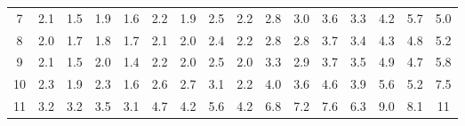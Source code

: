 \begin{table}[!htbp]
{\begin{tabular}{c|ccccccccccccccc}
        \rowcolor[HTML]{FFFFFF} 
        7                          & \multicolumn{1}{l|}{\cellcolor[HTML]{FFFFFF}2.1} & \cellcolor[HTML]{CCC0DA}1.5 & \cellcolor[HTML]{CCC0DA}1.9 & \cellcolor[HTML]{CCC0DA}1.6 & 2.2                         & \multicolumn{1}{l|}{\cellcolor[HTML]{CCC0DA}1.9} & 2.5                        & 2.2                         & 2.8                         & 3.0                         & 3.6                         & 3.3                       & 4.2                         & 5.7                         & 5.0                         \\
        \rowcolor[HTML]{FFFFFF} 
        8                          & \multicolumn{1}{l|}{\cellcolor[HTML]{CCC0DA}2.0} & \cellcolor[HTML]{CCC0DA}1.7 & \cellcolor[HTML]{CCC0DA}1.8 & \cellcolor[HTML]{CCC0DA}1.7 & 2.1                         & \multicolumn{1}{l|}{\cellcolor[HTML]{CCC0DA}2.0} & 2.4                        & 2.2                         & 2.8                         & 2.8                         & 3.7                         & 3.4                         & 4.3                         & 4.8                         & 5.2                         \\
        \rowcolor[HTML]{FFFFFF} 
        9                          & \multicolumn{1}{l|}{\cellcolor[HTML]{FFFFFF}2.1} & \cellcolor[HTML]{B1A0C7}1.5 & \cellcolor[HTML]{CCC0DA}2.0 & \cellcolor[HTML]{B1A0C7}1.4 & 2.2                         & \multicolumn{1}{l|}{\cellcolor[HTML]{CCC0DA}2.0} & 2.5                        & \cellcolor[HTML]{CCC0DA}2.0 & 3.3                         & 2.9                         & 3.7                         & 3.5                         & 4.9                         & 4.7                         & 5.8                         \\ \cline{3-7}
        \rowcolor[HTML]{FFFFFF} 
        10                         & 2.3                                              & \cellcolor[HTML]{CCC0DA}1.9 & 2.3                         & \cellcolor[HTML]{CCC0DA}1.6 & 2.6                         & 2.7                                              & 3.1                        & 2.2                         & 4.0                         & 3.6                         & 4.6                         & 3.9                         & 5.6                         & 5.2                         & 7.5                         \\
        \rowcolor[HTML]{FFFFFF} 
        11                         & 3.2                                              & 3.2                         & 3.5                         & 3.1                         & 4.7                         & 4.2                                              & 5.6                        & 4.2                         & 6.8                         & 7.2                         & 7.6                         & 6.3                         & 9.0                         & 8.1                         & \cellcolor[HTML]{8DB4E2}11  \\

\end{tabular}}
\end{table}
